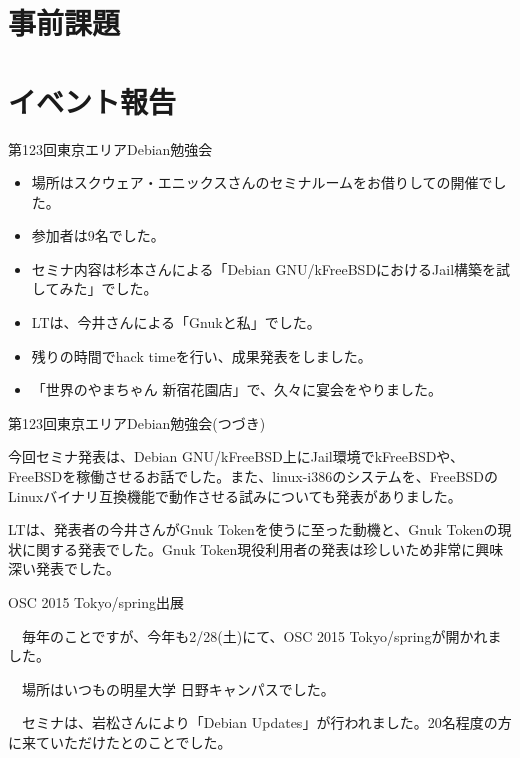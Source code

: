 \section{事前課題}
{\footnotesize

}

\section{イベント報告}

\begin{frame}{第123回東京エリアDebian勉強会}

\begin{itemize}
\item 場所はスクウェア・エニックスさんのセミナルームをお借りしての開催でした。
\item 参加者は9名でした。
\item セミナ内容は杉本さんによる「Debian GNU/kFreeBSDにおけるJail構築を試してみた」でした。
\item LTは、今井さんによる「Gnukと私」でした。
\item 残りの時間でhack timeを行い、成果発表をしました。
\item 「世界のやまちゃん 新宿花園店」で、久々に宴会をやりました。
\end{itemize} 
  
\end{frame}

\begin{frame}{第123回東京エリアDebian勉強会(つづき)}

  今回セミナ発表は、Debian GNU/kFreeBSD上にJail環境でkFreeBSDや、FreeBSDを稼働させるお話でした。また、linux-i386のシステムを、FreeBSDのLinuxバイナリ互換機能で動作させる試みについても発表がありました。

  LTは、発表者の今井さんがGnuk Tokenを使うに至った動機と、Gnuk Tokenの現状に関する発表でした。Gnuk Token現役利用者の発表は珍しいため非常に興味深い発表でした。
  
\end{frame}

\begin{frame}{OSC 2015 Tokyo/spring出展}

 　毎年のことですが、今年も2/28(土)にて、OSC 2015 Tokyo/springが開かれました。

 　場所はいつもの明星大学 日野キャンパスでした。

 　セミナは、岩松さんにより「Debian Updates」が行われました。20名程度の方に来ていただけたとのことでした。
  
\end{frame}

